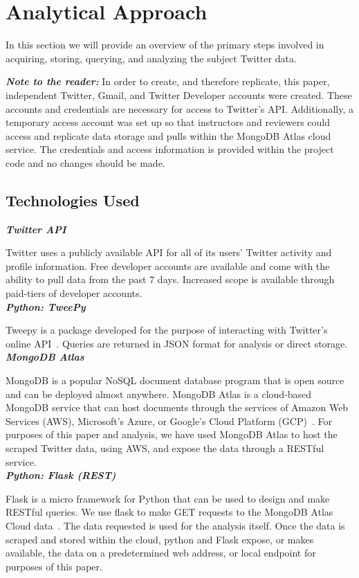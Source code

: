 \section{Analytical Approach}

In this section we will provide an overview of the primary steps involved in
acquiring, storing, querying, and analyzing the subject Twitter data.  

\textit{\bf Note to the reader:} 
In order to create, and therefore replicate, this paper, independent Twitter,
Gmail, and Twitter Developer accounts were created. These accounts and 
credentials are necessary for access to Twitter's API. Additionally, a 
temporary access account was set up so that instructors and reviewers could 
access and replicate data storage and pulls within the MongoDB Atlas cloud 
service. The credentials and access information is provided within the project
code and no changes should be made.

\subsection{Technologies Used}

\textit{\bf   Twitter API}

Twitter uses a publicly available API for all of its users' Twitter activity
and profile information. Free developer accounts are available and come with
the ability to pull data from the past 7 days. Increased scope is available
through paid-tiers of developer accounts.  \\ \textit{\bf Python: TweePy}

Tweepy is a package developed for the purpose of interacting with Twitter's
online API~\cite{PythonTweePy}. Queries are returned in JSON format for
analysis or direct storage.  \\ \textit{\bf MongoDB Atlas}

MongoDB is a popular NoSQL document database program that is open source and
can be deployed almost anywhere. MongoDB Atlas is a cloud-based MongoDB service
that can host documents through the services of Amazon Web Services (AWS),
Microsoft's Azure, or Google's Cloud Platform (GCP)~\cite{MongoDBAtlasPython}.
For purposes of this paper and analysis, we have used MongoDB Atlas to host the
scraped Twitter data, using AWS, and expose the data through a RESTful service.
\\ \textit{\bf Python: Flask (REST)}

Flask is a micro framework for Python that can be used to design and make
RESTful queries. We use flask to make GET requests to the MongoDB Atlas Cloud
data~\cite{MongoDBFlask}. The data requested is used for the analysis itself.
Once the data is scraped and stored within the cloud, python and Flask expose,
or makes available, the data on a predetermined web address, or local endpoint
for purposes of this paper.

